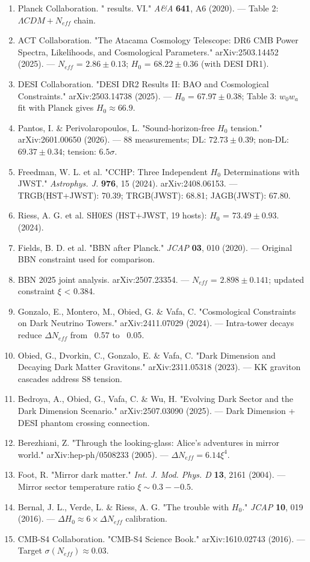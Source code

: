 \documentclass[aps,prd,preprint,superscriptaddress,longbibliography,floatfix]{revtex4-2}
\theoremstyle{remark}
\begin{document}
\begin{enumerate}
  \item Planck Collaboration. "\cite{Planck2018_VI} results. VI." \textit{A\&A} \textbf{641}, A6 (2020). --- Table 2: $\Lambda CDM+N_{eff}$ chain.
  \item ACT Collaboration. "The Atacama Cosmology Telescope: DR6 CMB Power Spectra, Likelihoods, and Cosmological Parameters." arXiv:2503.14452 (2025). --- $N_{eff}$ = $2.86 \pm 0.13$; $H_{0}$ = $68.22 \pm 0.36$ (with DESI DR1).
  \item DESI Collaboration. "DESI DR2 Results II: BAO and Cosmological Constraints." arXiv:2503.14738 (2025). --- $H_{0}$ = $67.97 \pm 0.38$; Table 3: $w_{0}w_a$ fit with Planck gives $H_{0} \approx 66.9$.
  \item Pantos, I. \& Perivolaropoulos, L. "Sound-horizon-free $H_{0}$ tension." arXiv:2601.00650 (2026). --- 88 measurements; DL: $72.73 \pm 0.39$; non-DL: $69.37 \pm 0.34$; tension: $6.5\sigma$.
  \item Freedman, W. L. et al. "CCHP: Three Independent $H_{0}$ Determinations with JWST." \textit{Astrophys. J.} \textbf{976}, 15 (2024). arXiv:2408.06153. --- TRGB(HST+JWST): 70.39; TRGB(JWST): 68.81; JAGB(JWST): 67.80.
  \item Riess, A. G. et al. SH0ES (HST+JWST, 19 hosts): $H_{0}$ = $73.49 \pm 0.93$. (2024).
  \item Fields, B. D. et al. "BBN after Planck." \textit{JCAP} \textbf{03}, 010 (2020). --- Original BBN constraint used for comparison.
  \item BBN 2025 joint analysis. arXiv:2507.23354. --- $N_{eff}$ = $2.898 \pm 0.141$; updated constraint $\xi$ < 0.384.
  \item Gonzalo, E., Montero, M., Obied, G. \& Vafa, C. "Cosmological Constraints on Dark Neutrino Towers." arXiv:2411.07029 (2024). --- Intra-tower decays reduce $\Delta N_{eff}$ from ~0.57 to ~0.05.
  \item Obied, G., Dvorkin, C., Gonzalo, E. \& Vafa, C. "Dark Dimension and Decaying Dark Matter Gravitons." arXiv:2311.05318 (2023). --- KK graviton cascades address S8 tension.
  \item Bedroya, A., Obied, G., Vafa, C. \& Wu, H. "Evolving Dark Sector and the Dark Dimension Scenario." arXiv:2507.03090 (2025). --- Dark Dimension + DESI phantom crossing connection.
  \item Berezhiani, Z. "Through the looking-glass: Alice's adventures in mirror world." arXiv:hep-ph/0508233 (2005). --- $\Delta N_{eff} = 6.14 \xi^{4}$.
  \item Foot, R. "Mirror dark matter." \textit{Int. J. Mod. Phys. D} \textbf{13}, 2161 (2004). --- Mirror sector temperature ratio $\xi \sim  0.3--0.5$.
  \item Bernal, J. L., Verde, L. \& Riess, A. G. "The trouble with $H_{0}$." \textit{JCAP} \textbf{10}, 019 (2016). --- $\Delta H_{0} \approx 6 \times \Delta N_{eff}$ calibration.
  \item CMB-S4 Collaboration. "CMB-S4 Science Book." arXiv:1610.02743 (2016). --- Target $\sigma(N_{eff}) \approx 0.03$.
\end{enumerate}
\end{document}
